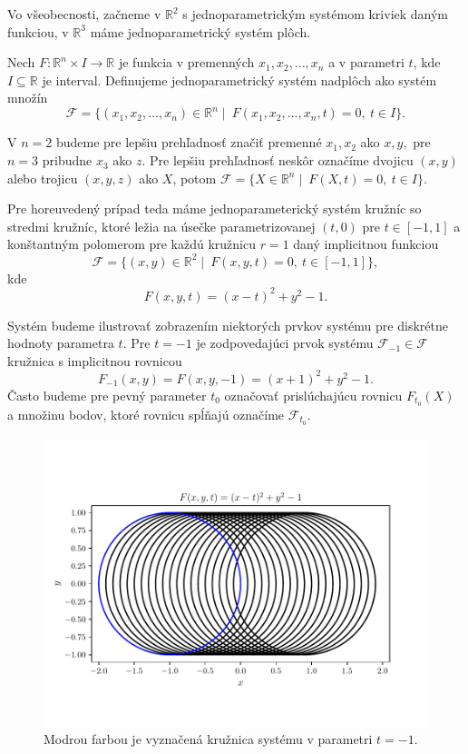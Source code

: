 Vo všeobecnosti, začneme v $\mathbb{R}^2$ s jednoparametrickým systémom kriviek daným funkciou, v $\mathbb{R}^3$ máme jednoparametrický systém plôch.

\begin{definition}
Nech $F \colon \mathbb{R}^{n} \times I \rightarrow \mathbb{R}$ je funkcia v premenných $ x_{1}, x_{2}, \ldots, x_{n} $ a v parametri $t$, kde $I \subseteq \mathbb{R}$ je interval. Definujeme jednoparametrický systém nadplôch ako systém množín 
$$
\mathcal{F} = \{ (x_{1}, x_{2}, \ldots, x_{n}) \in \mathbb{R}^{n} \mid  \ F(x_{1}, x_{2}, \ldots, x_{n}, t) = 0, \ t \in I \}.
$$
\end{definition}

V $n = 2$ budeme pre lepšiu prehľadnosť značiť premenné $x_{1}, x_{2}$ ako $x, y,$ pre $n = 3$ pribudne $x_{3}$ ako $z.$ Pre lepšiu prehľadnosť neskôr označíme dvojicu $(x,y)$ alebo trojicu $(x,y,z)$ ako $X$, potom
$\mathcal{F} = \{ X \in \mathbb{R}^{n} \mid \ F(X, t) = 0, \ t \in I \}. $

Pre horeuvedený prípad teda máme jednoparameterický systém kružníc so stredmi kružníc, ktoré ležia na úsečke parametrizovanej $(t,0)$ pre $t \in [-1,1]$ a konštantným polomerom pre každú kružnicu $r = 1$ daný implicitnou funkciou
$$ \mathcal{F} = \{ (x, y) \in \mathbb{R}^{2} \mid \ F(x, y, t) = 0, \ t \in [-1,1] \}, $$
kde
$$ F(x, y, t) = (x - t)^2 + y^2 - 1.$$

Systém budeme ilustrovať zobrazením niektorých prvkov systému pre diskrétne hodnoty parametra $t$. Pre $t = -1$ je zodpovedajúci prvok systému $\mathcal{F}_{-1} \in \mathcal{F}$  kružnica s implicitnou rovnicou
$$ F_{-1}(x, y) = F(x, y, -1) = (x + 1)^2 + y^2 - 1. $$
Často budeme pre pevný parameter $t_0$ označovať prislúchajúcu rovnicu $F_{t_0}(X)$ a množinu bodov, ktoré rovnicu spĺňajú označíme $\mathcal{F}_{t_0}.$

\begin{figure}[H]
	\centering
	\includegraphics[trim={0 1.65cm 0 2cm},clip]{images/one_element_of_system.pdf}
	\caption[Zobrazenie prvkov systému.]{Modrou farbou je vyznačená kružnica systému v parametri $t=-1$.}
	\label{fig:one_element_of_system}
\end{figure}

